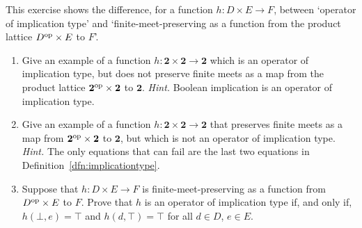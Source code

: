 \exercises \begin{exercise}\label{exe:difference-finite-meet-binary} This
exercise shows the difference, for a function $h \colon D \times E \to F$,
between `operator of implication type' and `finite-meet-preserving as a function
from the product lattice $D^{\mathrm{op}} \times E$ to $F$'.  \begin{enumerate} \item Give
an example of a function $h \colon \mathbf{2} \times \mathbf{2} \to \mathbf{2}$
which is an operator of implication type, but does not preserve finite meets as
a map from the product lattice $\mathbf{2}^{\mathrm{op}} \times \mathbf{2}$ to
$\mathbf{2}$.  {\it Hint.} Boolean implication is an operator of implication
type.  \item Give an example of a function $h \colon \mathbf{2} \times
\mathbf{2} \to \mathbf{2}$ that preserves finite meets as a map from
$\mathbf{2}^{\mathrm{op}} \times \mathbf{2}$ to $\mathbf{2}$, but which is not an operator
of implication type. {\it Hint.} The only equations that can fail are the last
two equations in Definition~\ref{dfn:implicationtype}.  \item Suppose that $h
\colon D \times E \to F$ is finite-meet-preserving as a function from $D^{\mathrm{op}}
\times E$ to $F$. Prove that $h$ is an operator of implication type if, and only
if, $h(\bot,e) = \top$ and $h(d, \top) = \top$ for all $d \in D$, $e \in E$.
\end{enumerate} \end{exercise}

